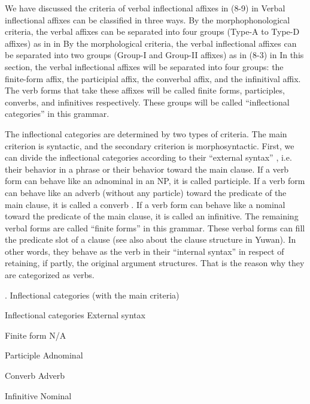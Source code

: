 We have discussed the criteria of verbal inflectional affixes in (8-9) in  Verbal inflectional affixes can be classified in three ways. By the morphophonological criteria, the verbal affixes can be separated into four groups (Type-A to Type-D affixes) as in  in  By the morphological criteria, the verbal inflectional affixes can be separated into two groups (Group-I and Group-II affixes) as in (8-3) in  In this section, the verbal inflectional affixes will be separated into four groups: the finite-form affix, the participial affix, the converbal affix, and the infinitival affix. The verb forms that take these affixes will be called finite forms, participles, converbs, and infinitives respectively. These groups will be called “inflectional categories” in this grammar.

  The inflectional categories are determined by two types of criteria. The main criterion is syntactic, and the secondary criterion is morphosyntactic. First, we can divide the inflectional categories according to their “external syntax” \citep{Haspelmath1996}, i.e. their behavior in a phrase or their behavior toward the main clause. If a verb form can behave like an adnominal in an NP, it is called participle. If a verb form can behave like an adverb (without any particle) toward the predicate of the main clause, it is called a converb \citep{Haspelmath1995}. If a verb form can behave like a nominal toward the predicate of the main clause, it is called an infinitive. The remaining verbal forms are called “finite forms” in this grammar. These verbal forms can fill the predicate slot of a clause (see also  about the clause structure in Yuwan). In other words, they behave as the verb in their “internal syntax” \citep{Haspelmath1996} in respect of retaining, if partly, the original argument structures. That is the reason why they are categorized as verbs.

\begin{styleBeschriftung}
\textmd{}\textmd{. Inflectional categories (with the main criteria)}
\end{styleBeschriftung}

Inflectional categories  External syntax

Finite form  N/A

Participle  Adnominal

Converb  Adverb

Infinitive  Nominal

